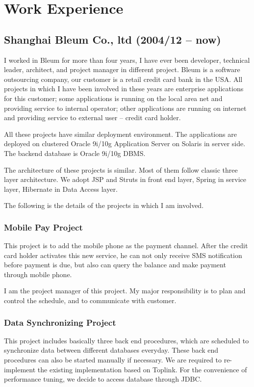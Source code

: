 \documentclass[a4paper,12pt]{article}
\begin{document}
\section{Work Experience}

\subsection{Shanghai Bleum Co., ltd (2004/12 -- now)}

I  worked in Bleum for more than four years, I have ever been developer, technical leader, architect, and project manager in different project. Bleum is a software outsourcing company, our customer is  a retail credit card bank in the USA. All projects in which I have been involved in these years are enterprise applications for this customer; some applications is running on the local area net and providing service to internal operator; other applications are running on internet and providing service to external user -- credit card holder. 

All these projects have similar deployment environment. The applications are deployed on clustered Oracle 9i/10g Application Server on Solaris in server side. The backend database is Oracle 9i/10g DBMS. 

The architecture of these projects is similar. Most of them follow classic three layer architecture. We adopt JSP and Struts in front end layer, Spring in service layer, Hibernate in Data Access layer. 

The following is the details of the projects in which I am involved.



\subsubsection{Mobile Pay Project}
This project is to add the mobile phone as the payment channel. After the credit card holder activates this new service, he can not only receive SMS notification before payment is due, but also can query the balance and make payment through mobile phone.

I am the project manager of this project. My major responsibility is to 
plan and control the schedule, and to communicate with customer.





\subsubsection{Data Synchronizing Project}
This project includes basically three back end procedures, which are scheduled to synchronize data between different databases everyday. These back end procedures can also be started manually if necessary. We are required to re-implement  the existing implementation based on Toplink. For the convenience of performance tuning, we decide to access database through JDBC.
\end{document}
